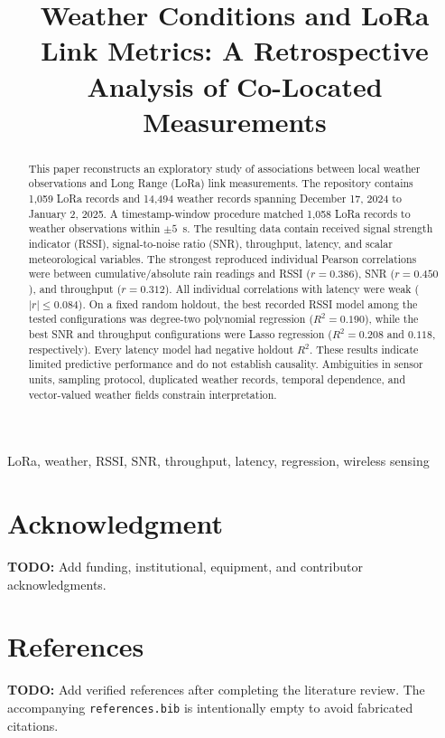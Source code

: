 \documentclass[conference]{IEEEtran}
\title{Weather Conditions and LoRa Link Metrics: A Retrospective Analysis of Co-Located Measurements}
\author{\IEEEauthorblockN{TODO: Author Name(s)}
\IEEEauthorblockA{TODO: Affiliation, City, Country\\
TODO: Email address(es)}}
\begin{document}
\maketitle

\begin{abstract}
This paper reconstructs an exploratory study of associations between local weather observations and Long Range (LoRa) link measurements. The repository contains 1,059 LoRa records and 14,494 weather records spanning December 17, 2024 to January 2, 2025. A timestamp-window procedure matched 1,058 LoRa records to weather observations within $\pm5$~s. The resulting data contain received signal strength indicator (RSSI), signal-to-noise ratio (SNR), throughput, latency, and scalar meteorological variables. The strongest reproduced individual Pearson correlations were between cumulative/absolute rain readings and RSSI ($r=0.386$), SNR ($r=0.450$), and throughput ($r=0.312$). All individual correlations with latency were weak ($|r|\leq0.084$). On a fixed random holdout, the best recorded RSSI model among the tested configurations was degree-two polynomial regression ($R^2=0.190$), while the best SNR and throughput configurations were Lasso regression ($R^2=0.208$ and $0.118$, respectively). Every latency model had negative holdout $R^2$. These results indicate limited predictive performance and do not establish causality. Ambiguities in sensor units, sampling protocol, duplicated weather records, temporal dependence, and vector-valued weather fields constrain interpretation.
\end{abstract}

\begin{IEEEkeywords}
LoRa, weather, RSSI, SNR, throughput, latency, regression, wireless sensing
\end{IEEEkeywords}











\section*{Acknowledgment}
\textbf{TODO:} Add funding, institutional, equipment, and contributor acknowledgments.

\section*{References}
\textbf{TODO:} Add verified references after completing the literature review. The accompanying \texttt{references.bib} is intentionally empty to avoid fabricated citations.
\end{document}
